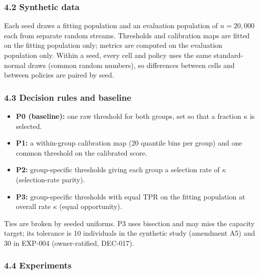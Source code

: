 \documentclass[
]{article}
\providecommand{\tightlist}{%
  \setlength{\itemsep}{0pt}\setlength{\parskip}{0pt}}
\begin{document}
\subsubsection{4.2 Synthetic data}\label{synthetic-data}

Each seed draws a fitting population and an evaluation population of
\(n = 20{,}000\) each from separate random streams. Thresholds and
calibration maps are fitted on the fitting population only; metrics are
computed on the evaluation population only. Within a seed, every cell
and policy uses the same standard-normal draws (common random numbers),
so differences between cells and between policies are paired by seed.

\subsubsection{4.3 Decision rules and
baseline}\label{decision-rules-and-baseline}

\begin{itemize}
\tightlist
\item
  \textbf{P0 (baseline):} one raw threshold for both groups, set so that
  a fraction \(\kappa\) is selected.
\item
  \textbf{P1:} a within-group calibration map (20 quantile bins per
  group) and one common threshold on the calibrated score.
\item
  \textbf{P2:} group-specific thresholds giving each group a selection
  rate of \(\kappa\) (selection-rate parity).
\item
  \textbf{P3:} group-specific thresholds with equal TPR on the fitting
  population at overall rate \(\kappa\) (equal opportunity).
\end{itemize}

Ties are broken by seeded uniforms. P3 uses bisection and may miss the
capacity target; its tolerance is 10 individuals in the synthetic study
(amendment A5) and 30 in EXP-004 (owner-ratified, DEC-017).

\subsubsection{4.4 Experiments}\label{experiments}
\end{document}

